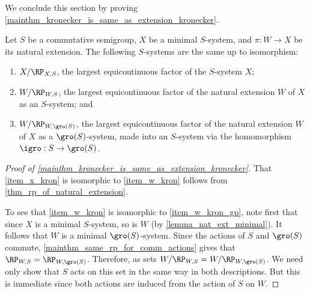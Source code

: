 We conclude this section by proving \cref{mainthm_kronecker_is_same_as_extension_kronecker}.

\begin{theorem}
    \label{mainthm_kronecker_is_same_as_extension_kronecker}
    Let $S$ be a commutative semigroup, $X$ be a minimal $S$-system, and $\pi: W \to X$ be its natural extension. The following $S$-systems are the same up to isomorphism:
    \begin{enumerate}
        \item \label{item_x_kron}
        $X/\RP_{X,S}$, the largest equicontinuous factor of the $S$-system $X$;
        \item \label{item_w_kron}
        $W / \RP_{W,S}$, the largest equicontinuous factor of the natural extension $W$ of $X$ as an $S$-system; and
        \item \label{item_w_kron_gp}
        $W / \RP_{W,\gro(S)}$, the largest equicontinuous factor of the natural extension $W$ of $X$ as a $\gro(S)$-system, made into an $S$-system via the homomorphism $\igro: S \to \gro(S)$.
    \end{enumerate}
\end{theorem}

\begin{proof}[Proof of \cref{mainthm_kronecker_is_same_as_extension_kronecker}]
    That \eqref{item_x_kron} is isomorphic to \eqref{item_w_kron} follows from \cref{thm_rp_of_natural_extension}.
    
    To see that \eqref{item_w_kron} is isomorphic to \eqref{item_w_kron_gp}, note first that since $X$ is a minimal $S$-system,  so is $W$ (by \cref{lemma_nat_ext_minimal}). It follows that $W$ is a minimal $\gro(S)$-system. Since the actions of $S$ and $\gro(S)$ commute, \cref{mainthm_same_rp_for_comm_actions} gives that $\RP_{W,S} = \RP_{W,\gro(S)}$.  Therefore, as sets $W / \RP_{W,S} = W / \RP_{W,\gro(S)}$.  We need only show that $S$ acts on this set in the same way in both descriptions.  But this is immediate since both actions are induced from the action of $S$ on $W$.
\end{proof}